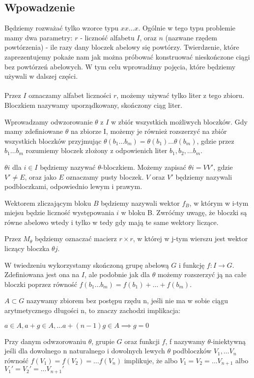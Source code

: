 \documentclass[12pt,a4paper]{amsart}
\begin{document}
\subsection{Wpowadzenie}
Będziemy rozważać tylko wzorce typu $xx\dots x$. Ogólnie w tego typu problemie mamy dwa parametry: $r$ - liczność alfabetu $I$, oraz $n$ (nazwane rzędem powtórzenia) - ile razy dany bloczek abelowy się powtórzy. Twierdzenie, które zaprezentujemy pokaże nam jak można próbować konstruować nieskończone ciągi bez powtórzeń abelowych. W tym celu wprowadźmy pojęcia, które będziemy używali w dalszej części.\\
\\
Przez $I$ oznaczamy alfabet liczności $r$, możemy używać tylko liter z tego zbioru. Bloczkiem nazywamy uporządkowany, skończony ciąg liter. 

Wprowadzamy odwzorowanie $\theta$ z $I$ w zbiór wszystkich możliwych bloczków. Gdy mamy zdefiniowane $\theta$ na zbiorze I, możemy je również rozszerzyć na zbiór wszystkich bloczków przyjmując $\theta(b_1 \dots b_m) = \theta(b_1) \dots \theta(b_m)$, gdzie przez $b_1 \dots b_m$ rozumiemy bloczek złożony z odpowienich liter $b_1, b_2, \dots b_m$.

$\theta i$ dla $i \in I$ będziemy nazywać $\theta$-bloczkiem. Możemy zapisać $\theta i = VV'$, gdzie $V' \neq E$, oraz jako $E$ oznaczamy pusty bloczek. $V$ oraz $V'$ będziemy nazywali podbloczkami, odpowiednio lewym i prawym.

Wektorem zliczającym bloku $B$ będziemy nazywali wektor $f_B$, w którym w i-tym miejsu będzie liczność występowania $i$ w bloku B. Zwróćmy uwagę, że bloczki są równe abelowo wtedy i tylko w tedy gdy mają te same wektory liczące.

Przez $M_{\theta}$ będziemy oznaczać macierz $r \times r$, w której w j-tym wierszu jest wektor liczący bloczka $\theta j$.

W twiedzeniu wykorzystamy skończoną grupę abelową $G$ i funkcję $f: I \rightarrow G$. Zdefiniowana jest ona na $I$, ale podobnie jak dla $\theta$ możemy rozszerzyć ją na całe bloczki poprzez równość $f(b_1 \dots b_m) = f(b_1) + \dots + f(b_m)$.

$A \subset G$ nazywamy zbiorem bez postępu rzędu n, jeśli nie ma w sobie ciągu arytmetycznego długości n, to znaczy zachodzi implikacja:
\begin{center}
$a \in A, a+g \in A, \dots a+(n-1)g \in A \implies g=0$
\end{center}

Przy danym odwzorowaniu $\theta$, grupie $G$ oraz funkcji $f$, f nazywamy $\theta$-iniektywną jeśli dla dowolnego n naturalnego i dowolnych lewych $\theta$ podbloczków $V_1, \dots V_n$ równość $f(V_1)=f(V_2)= \dots f(V_n)$ implikuje, że albo $V_1=V_2= \dots V_{n+1}$ albo $V_1'=V_2'= \dots V_{n+1}'$
\end{document}
